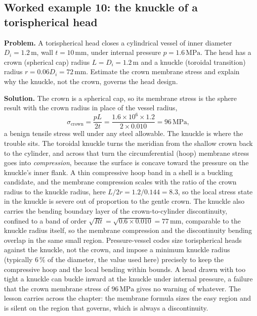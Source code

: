 \subsection*{Worked example 10: the knuckle of a torispherical head}

\textbf{Problem.} A torispherical head closes a cylindrical vessel of
inner diameter $D_i = 1.2\,\si{\meter}$, wall $t = 10\,\si{\milli
\meter}$, under internal pressure $p = 1.6\,\text{MPa}$. The head has a
crown (spherical cap) radius $L = D_i = 1.2\,\si{\meter}$ and a knuckle
(toroidal transition) radius $r = 0.06 D_i = 72\,\si{\milli\meter}$.
Estimate the crown membrane stress and explain why the knuckle, not the
crown, governs the head design.

\textbf{Solution.} The crown is a spherical cap, so its membrane stress
is the sphere result with the crown radius in place of the vessel radius,
\[
\sigma_{\text{crown}} = \frac{p L}{2 t}
= \frac{1.6\times 10^6 \times 1.2}{2\times 0.010}
= 96\,\text{MPa},
\]
a benign tensile stress well under any steel allowable. The knuckle is
where the trouble sits. The toroidal knuckle turns the meridian from the
shallow crown back to the cylinder, and across that turn the
circumferential (hoop) membrane stress goes into \emph{compression},
because the surface is concave toward the pressure on the knuckle's inner
flank. A thin compressive hoop band in a shell is a buckling candidate,
and the membrane compression scales with the ratio of the crown radius
to the knuckle radius, here $L/2r = 1.2/0.144 = 8.3$, so the local stress
state in the knuckle is severe out of proportion to the gentle crown.
The knuckle also carries the bending boundary layer of the
crown-to-cylinder discontinuity, confined to a band of order $\sqrt{R t}
= \sqrt{0.6\times 0.010} = 77\,\si{\milli\meter}$, comparable to the
knuckle radius itself, so the membrane compression and the discontinuity
bending overlap in the same small region. Pressure-vessel codes size
torispherical heads against the knuckle, not the crown, and impose a
minimum knuckle radius (typically $6\,\%$ of the diameter, the value used
here) precisely to keep the compressive hoop and the local bending within
bounds. A head drawn with too tight a knuckle can buckle inward at the
knuckle under internal pressure, a failure that the crown membrane stress
of $96\,\text{MPa}$ gives no warning of whatever. The lesson carries
across the chapter: the membrane formula sizes the easy region and is
silent on the region that governs, which is always a discontinuity.

